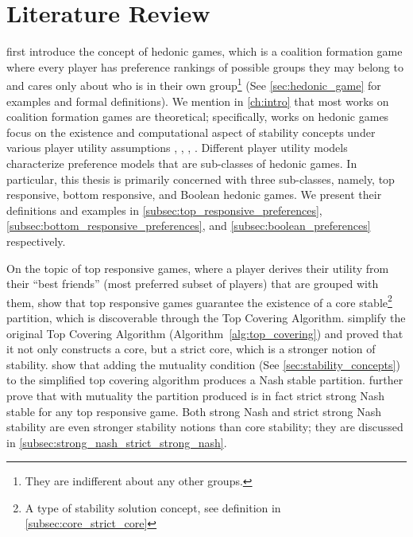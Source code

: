 \chapter{Literature Review}
\label{ch:review}

 first introduce the concept of hedonic games,
which is a coalition formation game where every player has preference rankings
of possible groups they may belong to and cares only about who is in their own
group\footnote{They are indifferent about any other groups.} (See
\autoref{sec:hedonic_game} for examples and formal definitions).
We mention in \autoref{ch:intro} that most works on coalition formation games
are theoretical; specifically, works on hedonic games focus on the existence
and computational aspect of stability concepts under various player utility
assumptions \cite {BOGOMOLNAIA2002201}, \cite{Aziz:2012:ESH:2343776.2343806},
\cite{aziz_savani_moulin_2016}, \cite{Aziz:2016:BHG:3032027.3032048}.
Different player utility models characterize preference models that are
sub-classes of hedonic games.
In particular, this thesis is primarily concerned with three sub-classes,
namely, top responsive, bottom responsive, and Boolean hedonic games.
We present their definitions and examples in
\autoref{subsec:top_responsive_preferences},
\autoref{subsec:bottom_responsive_preferences}, and
\autoref{subsec:boolean_preferences} respectively.

On the topic of top responsive games, where a player derives their utility
from their ``best friends'' (most preferred subset of players) that are grouped
with them,  show that top responsive games
guarantee the existence of a core stable\footnote{A type of stability solution
concept, see definition in \autoref{subsec:core_strict_core}} partition, which
is discoverable through the Top Covering Algorithm.
 simplify the original Top Covering Algorithm
(Algorithm~\ref{alg:top_covering}) and proved that it not only constructs a
core, but a strict core, which is a stronger notion of stability.
 show that adding the mutuality condition (See
\autoref{sec:stability_concepts}) to the simplified top covering algorithm
produces a Nash stable partition.
 further prove that with mutuality
the partition produced is in fact strict strong Nash stable for any top
responsive game.
Both strong Nash and strict strong Nash stability are even stronger stability
notions than core stability; they are discussed in
\autoref{subsec:strong_nash_strict_strong_nash}.

